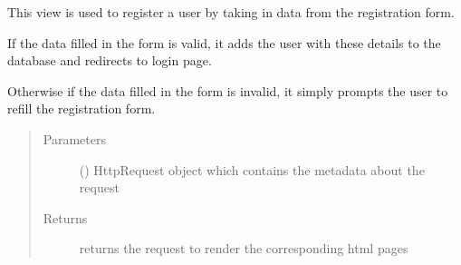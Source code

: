 \documentclass[letterpaper,10pt,english]{sphinxmanual}
\begin{document}
\begin{fulllineitems}
\label{\detokenize{users:users.views.register_user}}
\sphinxAtStartPar
This view is used to register a user by taking in data from the registration form.

\sphinxAtStartPar
If the data filled in the form is valid, it adds the user with these details to the database and redirects to login page.

\sphinxAtStartPar
Otherwise if the data filled in the form is invalid, it simply prompts the user to refill the registration form.
\begin{quote}\begin{description}
\item[{Parameters}] \leavevmode
\sphinxAtStartPar
{} () \textendash{} HttpRequest object which contains the metadata about the request

\item[{Returns}] \leavevmode
\sphinxAtStartPar
returns the request to render the corresponding html pages

\end{description}\end{quote}

\end{fulllineitems}

\end{document}
